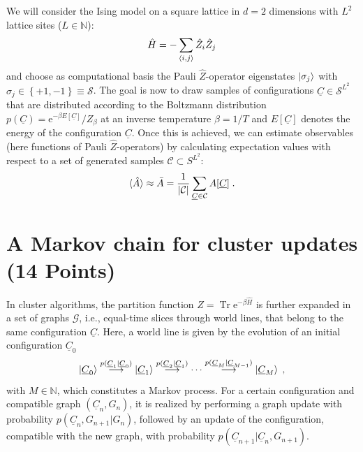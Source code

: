 \documentclass[a4paper, 12pt]{article}
\begin{document}
%
We will consider the Ising model on a square lattice in $d=2$ dimensions with $L^2$ lattice sites ($L\in\mathbb N$):
\begin{equation}
	\hat H = -\sum_{\braket{i,j}} \hat Z_i \hat Z_j
\end{equation}
and choose as computational basis the Pauli $\hat Z$-operator eigenstates $\ket{\sigma_j}$ with $\sigma_j \in \left\{+1, -1 \right\} \equiv \mathcal S$.
%
The goal is now to draw samples of configurations $\underline C \in \mathcal S^{L^2}$ that are distributed according to the Boltzmann distribution $p(\underline C) = \mathrm{e}^{-\beta E[\underline C]}/Z_\beta$ at an inverse temperature $\beta = 1/T$ and $E[\underline C]$ denotes the energy of the configuration $\underline C$.
%
Once this is achieved, we can estimate observables (here functions of Pauli $\hat Z$-operators) by calculating expectation values with respect to a set of generated samples $\mathcal C \subset S^{L^2}$:
\begin{equation}
	\braket{\hat A} \approx \bar A = \frac{1}{\lvert \mathcal C \rvert} \sum_{\underline C \in \mathcal C} A[\underline C] \; .
\end{equation}
%
\section{A Markov chain for cluster updates \textbf{(14 Points)}}
%
In cluster algorithms, the partition function $Z=\operatorname{Tr} \mathrm{e}^{-\beta \hat H}$ is further expanded in a set of graphs $\mathcal G$, i.e., equal-time slices through world lines, that belong to the same configuration $\underline C$.
%
Here, a world line is given by the evolution of an initial configuration $\underline C_0$
\begin{equation}
	\ket{\underline C_0} \stackrel{p(\underline C_1|\underline C_0)}{\longrightarrow} \ket{\underline C_1} \stackrel{p(\underline C_2|\underline C_1)}{\longrightarrow} \cdots \stackrel{p(\underline C_M|\underline C_{M-1})}{\longrightarrow} \ket{\underline C_M} \; ,
\end{equation}
with $M\in\mathbb N$, which constitutes a Markov process.
%
For a certain configuration and compatible graph $(\underline C_n, G_n)$, it is realized by performing a graph update with probability $p(\underline C_n, G_{n+1} | G_{n})$, followed by an update of the configuration, compatible with the new graph, with probability $p(\underline C_{n+1}|\underline C_n, G_{n+1})$.
%
\end{document}
